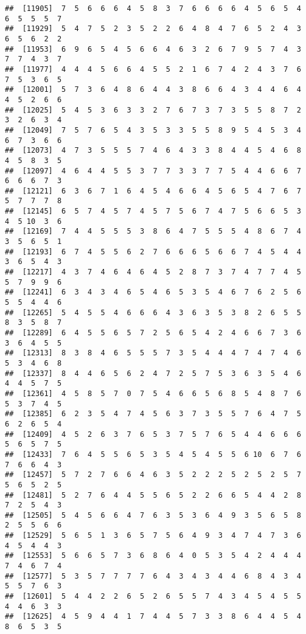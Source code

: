 \documentclass[
]{book}
\begin{document}
\begin{verbatim}
##  [11905]  7  5  6  6  6  4  5  8  3  7  6  6  6  6  4  5  6  5  4  6  5  5  5  7
##  [11929]  5  4  7  5  2  3  5  2  2  6  4  8  4  7  6  5  2  4  3  6  5  6  2  2
##  [11953]  6  9  6  5  4  5  6  6  4  6  3  2  6  7  9  5  7  4  3  7  7  4  3  7
##  [11977]  4  4  4  5  6  6  4  5  5  2  1  6  7  4  2  4  3  7  6  7  5  3  6  5
##  [12001]  5  7  3  6  4  8  6  4  4  3  8  6  6  4  3  4  4  6  4  4  5  2  6  6
##  [12025]  5  4  5  3  6  3  3  2  7  6  7  3  7  3  5  5  8  7  2  3  2  6  3  4
##  [12049]  7  5  7  6  5  4  3  5  3  3  5  5  8  9  5  4  5  3  4  6  7  3  6  6
##  [12073]  4  7  3  5  5  5  7  4  6  4  3  3  8  4  4  5  4  6  8  4  5  8  3  5
##  [12097]  4  6  4  4  5  5  3  7  7  3  3  7  7  5  4  4  6  6  7  6  6  6  7  3
##  [12121]  6  3  6  7  1  6  4  5  4  6  6  4  5  6  5  4  7  6  7  5  7  7  7  8
##  [12145]  6  5  7  4  5  7  4  5  7  5  6  7  4  7  5  6  6  5  3  4  5 10  3  6
##  [12169]  7  4  4  5  5  5  3  8  6  4  7  5  5  5  4  8  6  7  4  3  5  6  5  1
##  [12193]  6  7  4  5  5  6  2  7  6  6  6  5  6  6  7  4  5  4  4  3  6  5  4  3
##  [12217]  4  3  7  4  6  4  6  4  5  2  8  7  3  7  4  7  7  4  5  5  7  9  9  6
##  [12241]  6  3  4  3  4  6  5  4  6  5  3  5  4  6  7  6  2  5  6  5  5  4  4  6
##  [12265]  5  4  5  5  4  6  6  6  4  3  6  3  5  3  8  2  6  5  5  8  3  5  8  7
##  [12289]  6  4  5  5  6  5  7  2  5  6  5  4  2  4  6  6  7  3  6  3  6  4  5  5
##  [12313]  8  3  8  4  6  5  5  5  7  3  5  4  4  4  7  4  7  4  6  5  3  4  6  8
##  [12337]  8  4  4  6  5  6  2  4  7  2  5  7  5  3  6  3  5  4  6  4  4  5  7  5
##  [12361]  4  5  8  5  7  0  7  5  4  6  6  5  6  8  5  4  8  7  6  5  3  7  4  5
##  [12385]  6  2  3  5  4  7  4  5  6  3  7  3  5  5  7  6  4  7  5  6  2  6  5  4
##  [12409]  4  5  2  6  3  7  6  5  3  7  5  7  6  5  4  4  6  6  6  5  6  5  7  5
##  [12433]  7  6  4  5  5  6  5  3  5  4  5  4  5  5  6 10  6  7  6  7  6  6  4  3
##  [12457]  5  7  2  7  6  6  4  6  3  5  2  2  2  5  2  5  2  5  7  5  6  5  2  5
##  [12481]  5  2  7  6  4  4  5  5  6  5  2  2  6  6  5  4  4  2  8  7  2  5  4  3
##  [12505]  5  4  5  6  6  4  7  6  3  5  3  6  4  9  3  5  6  5  8  2  5  5  6  6
##  [12529]  5  6  5  1  3  6  5  7  5  6  4  9  3  4  7  4  7  3  6  4  5  4  4  3
##  [12553]  5  6  6  5  7  3  6  8  6  4  0  5  3  5  4  2  4  4  4  7  4  6  7  4
##  [12577]  5  3  5  7  7  7  7  6  4  3  4  3  4  4  6  8  4  3  4  5  5  7  6  3
##  [12601]  5  4  4  2  2  6  5  2  6  5  5  7  4  3  4  5  4  5  5  4  4  6  3  3
##  [12625]  4  5  9  4  4  1  7  4  4  5  7  3  3  8  6  4  4  5  4  8  6  5  3  5

\end{verbatim}
\end{document}
